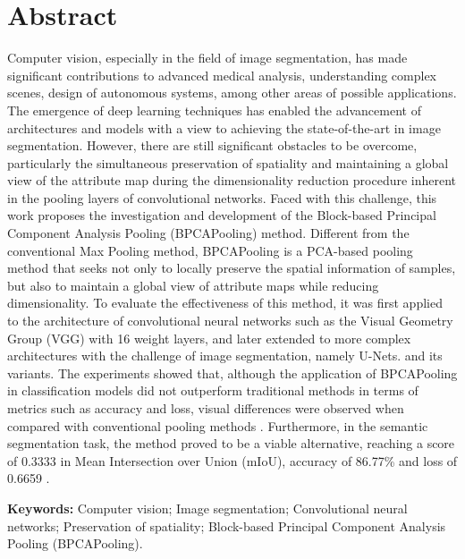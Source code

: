 \section*{Abstract}
\thispagestyle{empty}
Computer vision, especially in the field of image segmentation, has made significant contributions to advanced medical analysis, understanding complex scenes, design of autonomous systems, among other areas of possible applications. The emergence of deep learning techniques has enabled the advancement of architectures and models with a view to achieving the state-of-the-art in image segmentation.
However, there are still significant obstacles to be overcome, particularly the simultaneous preservation of spatiality and maintaining a global view of the attribute map during the dimensionality reduction procedure inherent in the pooling layers of convolutional networks.
Faced with this challenge, this work proposes the investigation and development of the Block-based Principal Component Analysis Pooling (BPCAPooling) method. Different from the conventional Max Pooling method, BPCAPooling is a PCA-based pooling method that seeks not only to locally preserve the spatial information of samples, but also to maintain a global view of attribute maps while reducing dimensionality.
To evaluate the effectiveness of this method, it was first applied to the architecture of convolutional neural networks such as the Visual Geometry Group (VGG) with 16 weight layers, and later extended to more complex architectures with the challenge of image segmentation, namely U-Nets. and its variants.
The experiments showed that, although the application of BPCAPooling in classification models did not outperform traditional methods in terms of metrics such as accuracy and loss, visual differences were observed when compared with conventional pooling methods . Furthermore, in the semantic segmentation task, the method proved to be a viable alternative, reaching a score of 0.3333 in Mean Intersection over Union (mIoU), accuracy of 86.77\% and loss of 0.6659 .

\textbf{Keywords:} Computer vision; Image segmentation; Convolutional neural networks; Preservation of spatiality; Block-based Principal Component Analysis Pooling (BPCAPooling).